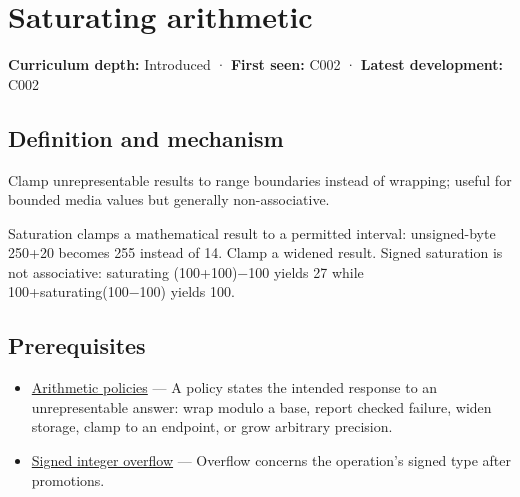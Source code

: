 \hypertarget{appendix-3999c6209649}{}\label{referencestart:appendix-3999c6209649}
\section{Saturating arithmetic}\label{appendix-3999c6209649-saturating-arithmetic}

\hypertarget{appendix-3999c6209649-saturating-arithmetic}{}

\textbf{Curriculum depth:} Introduced · \textbf{First seen:} C002 · \textbf{Latest development:} C002

\begin{allmightroledefinition}

\subsection{Definition and mechanism}\label{appendix-3999c6209649-definition-and-mechanism}

\hypertarget{appendix-3999c6209649-definition-and-mechanism}{}

Clamp unrepresentable results to range boundaries instead of wrapping; useful for bounded media values but generally non-associative.

\end{allmightroledefinition}

Saturation clamps a mathematical result to a permitted interval: unsigned-byte 250+20 becomes 255 instead of 14. Clamp a widened result. Signed saturation is not associative: saturating (100+100)−100 yields 27 while 100+saturating(100−100) yields 100.

\subsection{Prerequisites}\label{appendix-3999c6209649-prerequisites}

\hypertarget{appendix-3999c6209649-prerequisites}{}

\begin{itemize}
\tightlist
\item
  \hyperref[appendix-2ed044358b82]{Arithmetic policies} --- A policy states the intended response to an unrepresentable answer: wrap modulo a base, report checked failure, widen storage, clamp to an endpoint, or grow arbitrary precision.
\item
  \hyperref[appendix-1a599c924a4e]{Signed integer overflow} --- Overflow concerns the operation's signed type after promotions.
\end{itemize}

